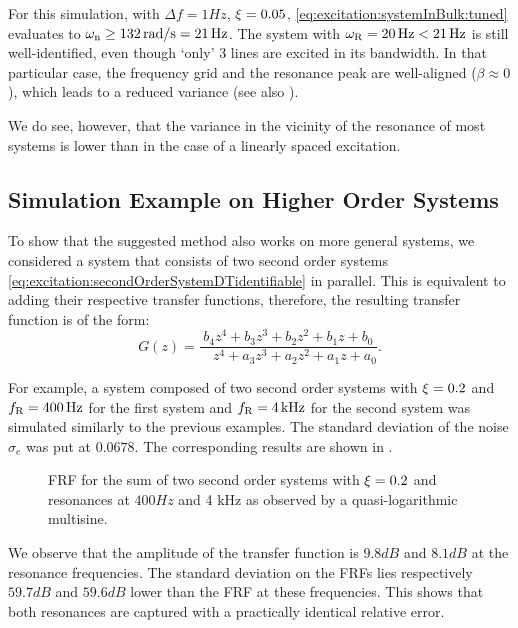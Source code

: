   For this simulation, with $\Delta f=1\unit{Hz}$, $\xi_{}=0.05$, \eqref{eq:excitation:systemInBulk:tuned} evaluates to $\omega_{\mathrm{n}} \geq 132 \,\mathrm{rad/s} = 21 \,\mathrm{Hz}$.
  The system with $\omega_{\mathrm{R}} = 20 \,\mathrm{Hz} < 21 \,\mathrm{Hz}$ is still well-identified, even though `only' $3$ lines are excited in its bandwidth.
  In that particular case, the frequency grid and the resonance peak are well-aligned ($\beta \approx 0$), which leads to a reduced variance (see also ).

  We do see, however, that the variance in the vicinity of the resonance of most systems is lower than in the case of a linearly spaced excitation.

  \subsection{Simulation Example on Higher Order Systems}
To show that the suggested method also works on more general systems, we considered a system that consists of two second order systems \eqref{eq:excitation:secondOrderSystemDTidentifiable} in parallel. 
This is equivalent to adding their respective transfer functions, therefore, the resulting transfer function is of the form:
\begin{equation}
  G \left( z \right) 
  = \frac{         b_4 z^{4} + b_3 z^{3} + b_2 z^{2} + b_1 z + b_0}%
         {\phantom{a_4}z^{4} + a_3 z^{3} + a_2 z^{2} + a_1 z + a_0}
  \text{.}
\label{eq:excitation:tfO4}
\end{equation}

For example, a system composed of two second order systems with $\xi_{} = 0.2$ and $f_{\mathrm{R}} = 400 \,\mathrm{Hz}$ for the first system and $f_{\mathrm{R}}=4 \,\mathrm{kHz}$ for the second system was simulated similarly to the previous examples. 
The standard deviation of the noise $\sigma_e$ was put at $0.0678$. The corresponding results are  shown in .

\begin{figure}%
  \centering
  \setlength{}
  \setlength\figureheight{0.68\figurewidth}
  
  \caption[Simulated  of sum of two sub-systems.]{\gls{FRF} for the sum of two second order systems with $\xi_{}=0.2$ and resonances at $ 400 \unit{Hz}$ and 4 \unit{kHz} as observed by a quasi-logarithmic multisine.}%
  \label{fig:excitation:sumSys}
\end{figure}

We observe that the amplitude of the transfer function is $9.8\unit{dB}$ and $8.1\unit{dB}$ at the resonance frequencies.
The standard deviation on the \glspl{FRF} lies respectively $59.7 \unit{dB}$ and $59.6 \unit{dB}$ lower than the \gls{FRF} at these frequencies. 
This shows that both resonances are captured with a practically identical relative error.
  
